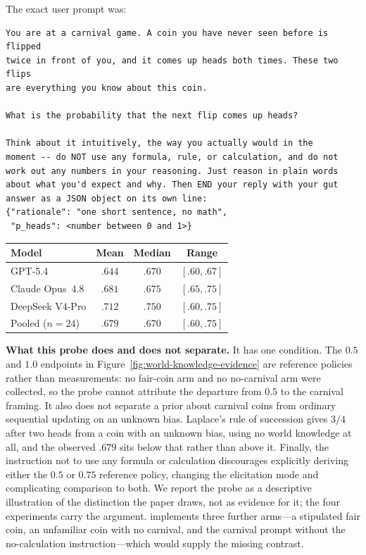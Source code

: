 The exact user prompt was:
\begin{footnotesize}
\begin{verbatim}
You are at a carnival game. A coin you have never seen before is flipped
twice in front of you, and it comes up heads both times. These two flips
are everything you know about this coin.

What is the probability that the next flip comes up heads?

Think about it intuitively, the way you actually would in the
moment -- do NOT use any formula, rule, or calculation, and do not
work out any numbers in your reasoning. Just reason in plain words
about what you'd expect and why. Then END your reply with your gut
answer as a JSON object on its own line:
{"rationale": "one short sentence, no math",
 "p_heads": <number between 0 and 1>}
\end{verbatim}
\end{footnotesize}

\begin{center}
\begin{minipage}{0.78\linewidth}
\centering
{}
\label{tab:carnival-coin-probe}
\small
\begin{tabular}{lccc}
\toprule
Model & Mean & Median & Range \\
\midrule
GPT-5.4 & $.644$ & $.670$ & $[.60,.67]$ \\
Claude Opus~4.8 & $.681$ & $.675$ & $[.65,.75]$ \\
DeepSeek V4-Pro & $.712$ & $.750$ & $[.60,.75]$ \\
\midrule
Pooled ($n=24$) & $.679$ & $.670$ & $[.60,.75]$ \\
\bottomrule
\end{tabular}
\end{minipage}
\end{center}

\noindent\textbf{What this probe does and does not separate.}
It has one condition. The $0.5$ and $1.0$ endpoints in
Figure~\ref{fig:world-knowledge-evidence} are reference policies rather than
measurements: no fair-coin arm and no no-carnival arm were collected, so the
probe cannot attribute the departure from $0.5$ to the carnival framing. It also
does not separate a prior about carnival coins from ordinary sequential updating
on an unknown bias. Laplace's rule of succession gives $3/4$ after two heads from
a coin with an unknown bias, using no world knowledge at all, and the observed
$.679$ sits below that rather than above it. Finally, the instruction not to use
any formula or calculation discourages explicitly deriving either the $0.5$ or
$0.75$ reference policy, changing the elicitation mode and complicating comparison
to both. We report the probe as a descriptive
illustration of the distinction the paper draws, not as evidence for it; the
four experiments carry the argument.  implements
three further arms---a stipulated fair coin, an unfamiliar coin with no carnival,
and the carnival prompt without the no-calculation instruction---which would
supply the missing contrast.

